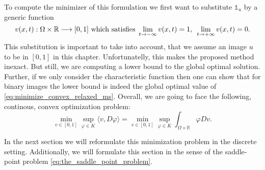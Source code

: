     To compute the minimizer of this formulation we first want to substitute $\mathds{1}_{u}$ by a generic function
        \begin{equation}
            v(x, t): \Omega \times \mathbb{R} \longrightarrow [0, 1] \,\, \textnormal{which satisfies} \,\, \lim_{t \rightarrow -\infty} v(x, t) = 1, \, \, \, \lim_{t \rightarrow +\infty} v(x, t) = 0.
        \label{eq:generic_functions}
        \end{equation}
    This substitution is important to take into account, that we assume an image $u$ to be in $[0, 1]$ in this chapter. Unfortunatelly, this makes the proposed method inexact. But still, we are computing a lower bound to the global optimal solution. Further, if we only consider the characteristic function then one can show that for binary images the lower bound is indeed the global optimal value of \ref{eq:minimize_convex_relaxed_ms}. Overall, we are going to face the following, continous, convex optimization problem:
        \begin{equation}
            \min_{v \in [0, 1]} \sup_{\varphi \in K} \langle v, D\varphi \rangle = \min_{v \in [0, 1]} \sup_{\varphi \in K} \int_{\Omega \times \mathbb{R}} \varphi Dv. \label{eq:continous_saddle_point_problem}
        \end{equation}

    In the next section we will reformulate this minimization problem in the discrete setting. Additionally, we will formulate this section in the sense of the saddle-point problem \ref{eq:the_saddle_point_problem}.


        

        

    
